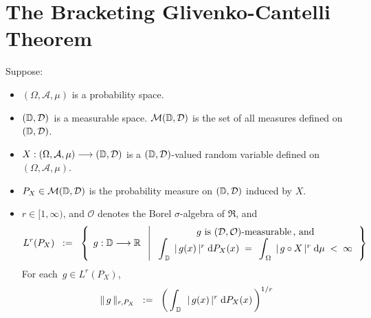 

\section{The Bracketing Glivenko-Cantelli Theorem}
\setcounter{theorem}{0}
\setcounter{equation}{0}


\renewcommand{\theenumi}{\roman{enumi}}
\renewcommand{\labelenumi}{\textnormal{(\theenumi)}$\;\;$}


\begin{definition}
\mbox{}\vskip 0.1cm
\noindent
Suppose:
\begin{itemize}
\item
	$(\Omega,\mathcal{A},\mu)$ is a probability space.
\item
	$(\mathbb{D},\mathcal{D})$\, is a measurable space.
	$\mathcal{M}(\mathbb{D},\mathcal{D})$ is the set of all measures defined on $(\mathbb{D},\mathcal{D})$.
\item
	$X : (\Omega,\mathcal{A},\mu) \longrightarrow (\mathbb{D},\mathcal{D})$
	is a $(\mathbb{D},\mathcal{D})$-valued random variable defined on
	$(\Omega,\mathcal{A},\mu)$.
\item
	$P_{X} \in \mathcal{M}(\mathbb{D},\mathcal{D})$ is the probability measure
	on $(\mathbb{D},\mathcal{D})$ induced by $X$.
\item
	$r \in [1,\infty)$, and $\mathcal{O}$ denotes the Borel $\sigma$-algebra of $\Re$, and
	\begin{equation*}
	L^{r}(P_{X})
	\;\; := \;\;
		\left\{\;\,
			g : \D \overset{{\color{white}.}}{\longrightarrow} \Re
		\;\;\left\vert\;
			\begin{array}{c}
			\textnormal{$g$ is $(\mathcal{D},\mathcal{O})$-measurable\,, and} \\
			\mathlarger{\int}_{\,\D}\;\, \vert\,g(x)\,\vert^{r} \;\d P_{X}(x)
				\;\overset{{\color{white}1}}{=}\;
				\mathlarger{\,\int}_{\,\Omega}\;\, \vert\,g \circ X\,\vert^{r} \;\d\mu \;<\; \infty
			\end{array}
		\right.
		\right\}
	\end{equation*}
	For each \,$g \in L^{r}(P_{X})$,
	\begin{equation*}
	\Vert\,g\,\Vert_{r,P_{X}} 
	\;\; := \;\;
		\left(\,\int_{\,\D}\;\, \vert\,g(x)\,\vert^{r} \;\d P_{X}(x)\,\right)^{1/r}

\end{equation*}
\end{itemize}
\end{definition}
